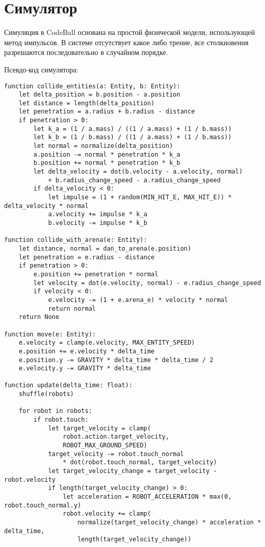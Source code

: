 \chapter{Симулятор}

Симуляция в CodeBall основана на простой физической модели, использующей метод импульсов.
В системе отсутствует какое либо трение, все столкновения разрешаются последовательно в случайном порядке.

Псевдо-код симулятора:

\begin{verbatim}
function collide_entities(a: Entity, b: Entity):
    let delta_position = b.position - a.position
    let distance = length(delta_position)
    let penetration = a.radius + b.radius - distance
    if penetration > 0:
        let k_a = (1 / a.mass) / ((1 / a.mass) + (1 / b.mass))
        let k_b = (1 / b.mass) / ((1 / a.mass) + (1 / b.mass))
        let normal = normalize(delta_position)
        a.position -= normal * penetration * k_a
        b.position += normal * penetration * k_b
        let delta_velocity = dot(b.velocity - a.velocity, normal)
            + b.radius_change_speed - a.radius_change_speed
        if delta_velocity < 0:
            let impulse = (1 + random(MIN_HIT_E, MAX_HIT_E)) * delta_velocity * normal
            a.velocity += impulse * k_a
            b.velocity -= impulse * k_b

function collide_with_arena(e: Entity):
    let distance, normal = dan_to_arena(e.position)
    let penetration = e.radius - distance
    if penetration > 0:
        e.position += penetration * normal
        let velocity = dot(e.velocity, normal) - e.radius_change_speed
        if velocity < 0:
            e.velocity -= (1 + e.arena_e) * velocity * normal
            return normal
    return None

function move(e: Entity):
    e.velocity = clamp(e.velocity, MAX_ENTITY_SPEED)
    e.position += e.velocity * delta_time
    e.position.y -= GRAVITY * delta_time * delta_time / 2
    e.velocity.y -= GRAVITY * delta_time

function update(delta_time: float):
    shuffle(robots)

    for robot in robots:
        if robot.touch:
            let target_velocity = clamp(
                robot.action.target_velocity,
                ROBOT_MAX_GROUND_SPEED)
            target_velocity -= robot.touch_normal
                * dot(robot.touch_normal, target_velocity)
            let target_velocity_change = target_velocity - robot.velocity
            if length(target_velocity_change) > 0:
                let acceleration = ROBOT_ACCELERATION * max(0, robot.touch_normal.y)
                robot.velocity += clamp(
                    normalize(target_velocity_change) * acceleration * delta_time,
                    length(target_velocity_change))


\end{verbatim}
